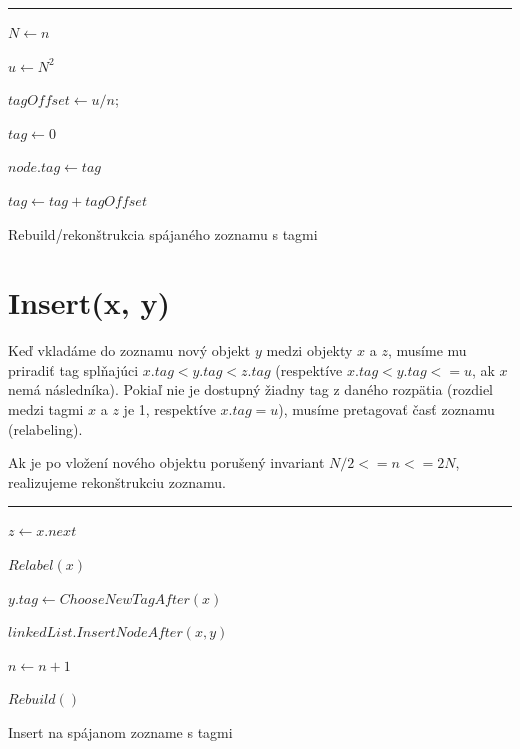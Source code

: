 \documentclass[
  digital,     %
  oneside,     %
  nosansbold,  %
  nocolorbold, %
  lof,         %
  lot,         %
]{fithesis4}
\begin{document}
\begin{algorithm}
\hrule\vspace{0.2em}
$N \leftarrow n$\;

$u \leftarrow N^2$\;

$tagOffset \leftarrow u / n$; 

$tag \leftarrow 0$\;

{
    $node.tag \leftarrow tag$\;
    
    $tag \leftarrow tag + tagOffset$\;
}

\caption{Rebuild/rekonštrukcia spájaného zoznamu s tagmi}
\end{algorithm}

\section{Insert(x, y)}

Keď vkladáme do zoznamu nový objekt $y$ medzi objekty $x$ a $z$, musíme mu priradiť tag splňajúci $x.tag < y.tag < z.tag$ (respektíve $x.tag < y.tag <= u$, ak $x$ nemá následníka).
Pokiaľ nie je dostupný žiadny tag z daného rozpätia (rozdiel medzi tagmi $x$ a $z$ je 1, respektíve $x.tag = u$), musíme pretagovať časť zoznamu (relabeling).

Ak je po vložení nového objektu porušený invariant $N/2 <= n <= 2N$, realizujeme rekonštrukciu zoznamu.

\begin{algorithm}
\hrule\vspace{0.2em}
$z \leftarrow x.next$\;

{
    $Relabel(x)$\;
}

$y.tag \leftarrow ChooseNewTagAfter(x)$\;


$linkedList.InsertNodeAfter(x, y)$\;


$n \leftarrow n + 1$\;

{
    $Rebuild()$\;
}
\caption{Insert na spájanom zozname s tagmi}
\end{algorithm}
\end{document}
